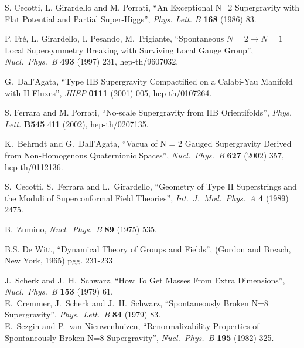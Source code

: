 \documentclass[a4paper,12pt]{article}
\begin{document}
\begin{thebibliography}{99}
S. Cecotti, L. Girardello and M. Porrati, ``An Exceptional N=2
Supergravity with Flat Potential and Partial Super-Higgs'', {\it
Phys. Lett. B} {\bf 168} (1986) 83.


P. Fr\'e, L. Girardello, I. Pesando, M. Trigiante, 
``Spontaneous $N=2 \to N=1$ Local Supersymmetry Breaking with Surviving Local Gauge Group'',
{\it Nucl.\ Phys.\ B} {\bf 493} (1997) 231, hep-th/9607032.



 G.~Dall'Agata, ``Type IIB Supergravity Compactified on a Calabi-Yau Manifold with H-Fluxes'',
{\it JHEP} {\bf 0111} (2001) 005, hep-th/0107264.


 S. Ferrara and M. Porrati, ``No-scale Supergravity from IIB Orientifolds'',  {\it
Phys. Lett.} {\bf B545} 411 (2002), hep-th/0207135.




K.~Behrndt and G.~Dall'Agata,
``Vacua of N = 2 Gauged Supergravity Derived from Non-Homogenous  Quaternionic Spaces'',
{\it Nucl.\ Phys.\ B} {\bf 627} (2002) 357, hep-th/0112136.




S.~Cecotti, S.~Ferrara and L.~Girardello,
``Geometry of Type II Superstrings and the Moduli of Superconformal Field Theories'',
{\it Int.\ J.\ Mod.\ Phys.\ A} {\bf 4} (1989) 2475.


B.~Zumino,
{\it Nucl.\ Phys.\ B} {\bf 89} (1975) 535.

B.S. De Witt, ``Dynamical Theory of Groups and Fields'', (Gordon and Breach, New York, 1965) pgg. 231-233

 J.~Scherk and J.~H.~Schwarz,
``How To Get Masses From Extra Dimensions'', {\it Nucl.\ Phys.\ B} {\bf 153} (1979) 61.\\
  E.~Cremmer, J.~Scherk and J.~H.~Schwarz, 
``Spontaneously Broken N=8 Supergravity'', {\it Phys.\ Lett.\ B} {\bf 84} (1979) 83.\\
 E.~Sezgin and P.~van Nieuwenhuizen,
``Renormalizability Properties of Spontaneously Broken N=8 Supergravity'', {\it Nucl.\ Phys.\ B} {\bf 195} (1982) 325. 




\end{thebibliography}
\end{document}
